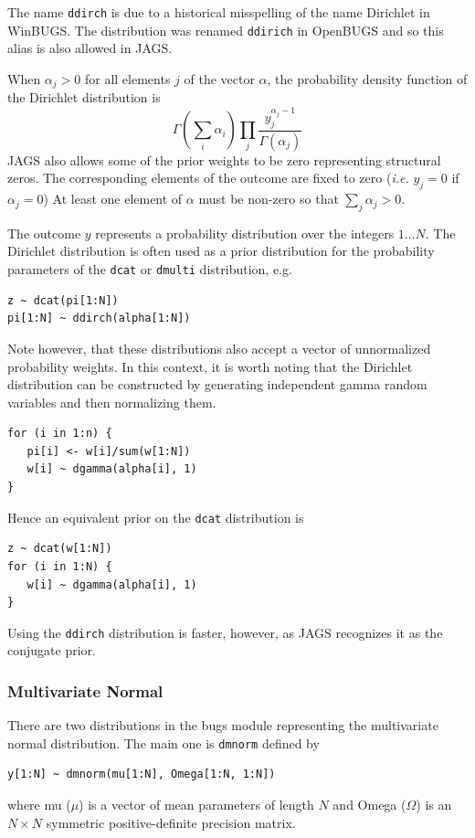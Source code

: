 \documentclass[11pt, a4paper, titlepage]{report}
\begin{document}
{The name \texttt{ddirch} is due to a historical misspelling of the
name Dirichlet in WinBUGS. The distribution was renamed
\texttt{ddirich} in OpenBUGS and so this alias is also allowed in
JAGS.

When $\alpha_j > 0$ for all elements $j$ of the vector $\alpha$, the
probability density function of the Dirichlet distribution is 
\[
\Gamma(\sum_i \alpha_i) \prod_j 
\frac{\textstyle y_j^{\alpha_j - 1}}{\textstyle \Gamma(\alpha_j)}
\]
JAGS also allows some of the prior weights to be zero representing
structural zeros. The corresponding elements of the outcome are fixed
to zero ({\em i.e.}  $y_j = 0$ if $\alpha_j = 0$) At least one
element of $\alpha$ must be non-zero so that $\sum_j \alpha_j > 0$.

The outcome $y$ represents a probability distribution over the
integers $1 \ldots N$. The Dirichlet distribution is often used as
a prior distribution for the probability parameters of the \texttt{dcat}
or \texttt{dmulti} distribution, e.g.
\begin{verbatim}
z ~ dcat(pi[1:N])
pi[1:N] ~ ddirch(alpha[1:N])
\end{verbatim}
Note however, that these distributions also accept a vector of
unnormalized probability weights. In this context, it is worth noting
that the Dirichlet distribution can be constructed by generating
independent gamma random variables and then normalizing them.
\begin{verbatim}
for (i in 1:n) {
   pi[i] <- w[i]/sum(w[1:N])
   w[i] ~ dgamma(alpha[i], 1)
}
\end{verbatim}
Hence an equivalent prior on the \texttt{dcat} distribution is
\begin{verbatim}
z ~ dcat(w[1:N])
for (i in 1:N) {
   w[i] ~ dgamma(alpha[i], 1)
}
\end{verbatim}
Using the \texttt{ddirch} distribution is faster, however, as
JAGS recognizes it as the conjugate prior.

\subsubsection{Multivariate Normal}

There are two distributions in the bugs module representing the
multivariate normal distribution. The main one is \texttt{dmnorm}
defined by
\begin{verbatim}
y[1:N] ~ dmnorm(mu[1:N], Omega[1:N, 1:N])
\end{verbatim}
where mu ($\mu$) is a vector of mean parameters of length $N$ and
Omega ($\Omega$) is an $N \times N$ symmetric positive-definite
precision matrix.

}
\end{document}
